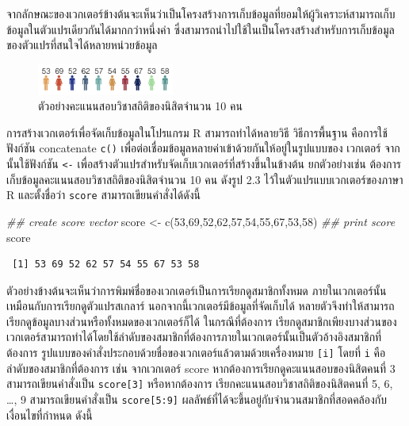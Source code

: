 \documentclass[
  a4paper,
]{book}
\newenvironment{Shaded}{\begin{snugshade}}{\end{snugshade}}
\newcommand{\DecValTok}[1]{\textcolor[rgb]{0.68,0.00,0.00}{#1}}
\newcommand{\DocumentationTok}[1]{\textcolor[rgb]{0.37,0.37,0.37}{\textit{#1}}}
\newcommand{\FunctionTok}[1]{\textcolor[rgb]{0.28,0.35,0.67}{#1}}
\newcommand{\NormalTok}[1]{\textcolor[rgb]{0.00,0.23,0.31}{#1}}
\newcommand{\OtherTok}[1]{\textcolor[rgb]{0.00,0.23,0.31}{#1}}
\begin{document}
จากลักษณะของเวกเตอร์ข้างต้นจะเห็นว่าเป็นโครงสร้างการเก็บข้อมูลที่ยอมให้ผู้วิเคราะห์สามารถเก็บข้อมูลในตัวแปรเดียวกันได้มากกว่าหนึ่งค่า
ซึ่งสามารถนำไปใช้ในเป็นโครงสร้างสำหรับการเก็บข้อมูลของตัวแปรที่สนใจได้หลายหน่วยข้อมูล

\begin{figure}

\begin{minipage}{\linewidth}

\includegraphics[width=0.4\textwidth,height=\textheight]{img/02Vector.png}

\end{minipage}%

\caption{\label{fig-Help}ตัวอย่างคะแนนสอบวิชาสถิติของนิสิตจำนวน 10 คน}

\end{figure}%

การสร้างเวกเตอร์เพื่อจัดเก็บข้อมูลในโปรแกรม R สามารถทำได้หลายวิธี วิธีการพื้นฐาน
คือการใช้ฟังก์ชัน concatenate \texttt{c()}
เพื่อต่อเชื่อมข้อมูลหลายค่าเข้าด้วยกันให้อยู่ในรูปแบบของ เวกเตอร์ จากนั้นใช้ฟังก์ชัน
\texttt{\textless{}-} เพื่อสร้างตัวแปรสำหรับจัดเก็บเวกเตอร์ที่สร้างขึ้นในข้างต้น
ยกตัวอย่างเช่น ต้องการเก็บข้อมูลคะแนนสอบวิชาสถิติของนิสิตจำนวน 10 คน ดังรูป 2.3
ไว้ในตัวแปรแบบเวกเตอร์ของภาษา R และตั้งชื่อว่า \texttt{score}
สามารถเขียนคำสั่งได้ดังนี้

\begin{Shaded}
\begin{Highlighting}[]
\DocumentationTok{\#\# create score vector }
\NormalTok{score }\OtherTok{\textless{}{-}} \FunctionTok{c}\NormalTok{(}\DecValTok{53}\NormalTok{,}\DecValTok{69}\NormalTok{,}\DecValTok{52}\NormalTok{,}\DecValTok{62}\NormalTok{,}\DecValTok{57}\NormalTok{,}\DecValTok{54}\NormalTok{,}\DecValTok{55}\NormalTok{,}\DecValTok{67}\NormalTok{,}\DecValTok{53}\NormalTok{,}\DecValTok{58}\NormalTok{)}
\DocumentationTok{\#\# print score}
\NormalTok{score}
\end{Highlighting}
\end{Shaded}

\begin{verbatim}
 [1] 53 69 52 62 57 54 55 67 53 58
\end{verbatim}

ตัวอย่างข้างต้นจะเห็นว่าการพิมพ์ชื่อของเวกเตอร์เป็นการเรียกดูสมาชิกทั้งหมด
ภายในเวกเตอร์นั้นเหมือนกับการเรียกดูตัวแปรสเกลาร์ นอกจากนี้เวกเตอร์มีข้อมูลที่จัดเก็บได้
หลายตัวจึงทำให้สามารถเรียกดูข้อมูลบางส่วนหรือทั้งหมดของเวกเตอร์ก็ได้ ในกรณีที่ต้องการ
เรียกดูสมาชิกเพียงบางส่วนของเวกเตอร์สามารถทำได้โดยใช้ลำดับของสมาชิกที่ต้องการภายในเวกเตอร์นั้นเป็นตัวอ้างอิงสมาชิกที่ต้องการ
รูปแบบของคำสั่งประกอบด้วยชื่อของเวกเตอร์แล้วตามด้วยเครื่องหมาย \texttt{{[}i{]}}
โดยที่ \texttt{i} คือลำดับของสมาชิกที่ต้องการ เช่น จากเวกเตอร์ score
หากต้องการเรียกดูคะแนนสอบของนิสิตคนที่ 3 สามารถเขียนคำสั่งเป็น
\texttt{score{[}3{]}} หรือหากต้องการ เรียกคะแนนสอบวิชาสถิติของนิสิตคนที่ 5, 6,
\ldots, 9 สามารถเขียนคำสั่งเป็น \texttt{score{[}5:9{]}}
ผลลัพธ์ที่ได้จะขึ้นอยู่กับจำนวนสมาชิกที่สอดคล้องกับเงื่อนไขที่กำหนด ดังนี้
\end{document}
